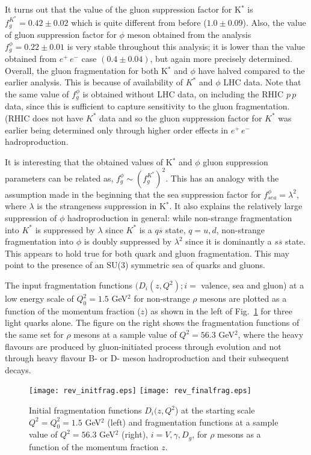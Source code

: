 \documentclass{ws-ijmpa}
\begin{document}
It turns out that the value of the gluon suppression factor for K$^*$
is $f_g^{K^{*}}=0.42 \pm 0.02$ which is quite different from
before\cite{Savinlo} ($1.0 \pm 0.09$).  Also, the value of gluon suppression
factor for $\phi$ meson obtained from the analysis $f_g^{\phi} = 0.22 \pm
0.01$ is very stable throughout this analysis; it is lower than the value
obtained from $e^+\,e^-$ case $(0.4\pm 0.04)$, but again more precisely
determined. Overall, the gluon fragmentation for both K$^*$ and $\phi$
have halved compared to the earlier analysis. This is because of
availability of $K^*$ and $\phi$ LHC data. Note that the same value of
$f_g^{\phi}$ is obtained without LHC data, on including the RHIC $p\,p$
data, since this is sufficient to capture sensitivity to the gluon
fragmentation. (RHIC does not have $K^*$ data and so the gluon
suppression factor for $K^*$ was earlier being determined only through
higher order effects in $e^+\,e^-$ hadroproduction. 

It is interesting that the obtained values of K$^*$ and $\phi$
gluon suppression parameters can be related as, $f_g^{\phi} \sim
(f_g^{K^*})^2$. This has an analogy with the assumption made in
the beginning that the sea suppression factor for $f_{sea}^{\phi} =
\lambda^2$, where $\lambda$ is the strangeness suppression in K$^*$. It
also explains the relatively large suppression of $\phi$ hadroproduction
in general: while non-strange fragmentation into $K^*$ is suppressed by
$\lambda$ since $K^*$ is a $q\overline{s}$ state, $q = u,d$, non-strange
fragmentation into $\phi$ is doubly suppressed by $\lambda^2$ since it
is dominantly a $s\overline{s}$ state. This appears to hold true for
both quark and gluon fragmentation. This may point to the presence of an
SU(3) symmetric sea of quarks and gluons.

The input fragmentation functions $(D_i(z,Q^2); i=$ valence, sea and
gluon) at a low energy scale of $Q_0^2 = 1.5$ GeV$^2$ for non-strange
$\rho$ mesons are plotted as a function of the momentum fraction ($z$)
as shown in the left of Fig.~\ref{fig:fragfns} for three light quarks
alone.  The figure on the right shows the fragmentation functions of the
same set for $\rho$ mesons at a sample value of $Q^2 = 56.3$ GeV$^2$,
where the heavy flavours are produced by gluon-initiated process through
evolution and not through heavy flavour B- or D- meson hadroproduction
and their subsequent decays.

\begin{figure}[htp]
\texttt{[image: rev\_initfrag.eps]}
\texttt{[image: rev\_finalfrag.eps]}
\vspace*{8pt}
\caption{Initial fragmentation functions $D_i (z, Q^2$) at the starting
scale $Q^2 = Q_0^2 = 1.5$ GeV$^2$ (left) and fragmentation functions
at a sample value of $Q^2 = 56.3$ GeV$^2$ (right), $i=V, \gamma,D_g$,
for $\rho$ mesons as a function of the momentum fraction $z$.}
\label{fig:fragfns}
\end{figure}
\end{document}

